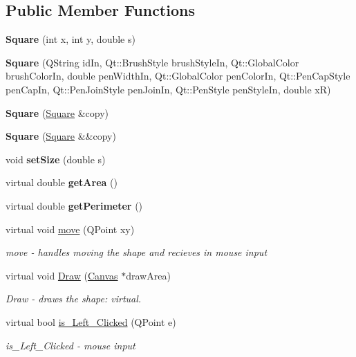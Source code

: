 \subsection*{Public Member Functions}
\begin{DoxyCompactItemize}
\item 
\mbox{\label{class_square_a5f961462240a582c0435860b84b49aa7}} 
{\bfseries Square} (int x, int y, double s)
\item 
\mbox{\label{class_square_a467ac8214b403ae54eb70c632710e591}} 
{\bfseries Square} (Q\+String id\+In, Qt\+::\+Brush\+Style brush\+Style\+In, Qt\+::\+Global\+Color brush\+Color\+In, double pen\+Width\+In, Qt\+::\+Global\+Color pen\+Color\+In, Qt\+::\+Pen\+Cap\+Style pen\+Cap\+In, Qt\+::\+Pen\+Join\+Style pen\+Join\+In, Qt\+::\+Pen\+Style pen\+Style\+In, double xR)
\item 
\mbox{\label{class_square_a47e8c3e52b0cee679b9d2e3b53ad4da6}} 
{\bfseries Square} (\hyperlink{class_square}{Square} \&copy)
\item 
\mbox{\label{class_square_aa18cd8139b5b19cf95852d4c0801705c}} 
{\bfseries Square} (\hyperlink{class_square}{Square} \&\&copy)
\item 
\mbox{\label{class_square_a5f6ea125b5218b4abd87b591d4d3a3b8}} 
void {\bfseries set\+Size} (double s)
\item 
\mbox{\label{class_square_a81ac7c0d1056d92aa8e380948f58b76c}} 
virtual double {\bfseries get\+Area} ()
\item 
\mbox{\label{class_square_a7f112541e11aca59b90fa866b3104718}} 
virtual double {\bfseries get\+Perimeter} ()
\item 
virtual void \hyperlink{class_square_a49d1e790212e18cb43d7647385cafa20}{move} (Q\+Point xy)
\begin{DoxyCompactList}\small\item\em move -\/ handles moving the shape and recieves in mouse input \end{DoxyCompactList}\item 
virtual void \hyperlink{class_square_a30b97f9d3fbd7d226a887ac157b827a0}{Draw} (\hyperlink{class_canvas}{Canvas} $\ast$draw\+Area)
\begin{DoxyCompactList}\small\item\em Draw -\/ draws the shape\+: virtual. \end{DoxyCompactList}\item 
virtual bool \hyperlink{class_square_aaf0989a3dba67b2502f3a306e0136e69}{is\+\_\+\+Left\+\_\+\+Clicked} (Q\+Point e)
\begin{DoxyCompactList}\small\item\em is\+\_\+\+Left\+\_\+\+Clicked -\/ mouse input \end{DoxyCompactList}\end{DoxyCompactItemize}


